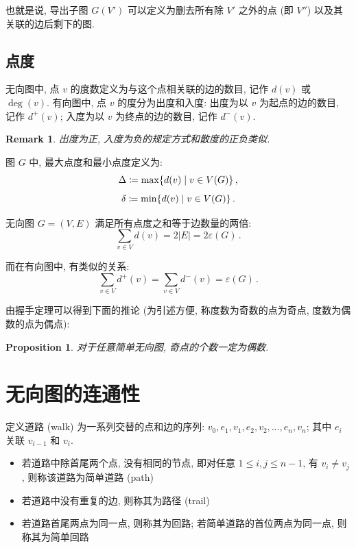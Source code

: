 \documentclass[UTF8]{ctexart}
\theoremstyle{mystyle}
\newtheorem{proposition}{Proposition}[section]
\theoremstyle{myremark}
\newtheorem*{remark}{Remark}
\theoremstyle{plain}
\DeclarePairedDelimiter\set{\{}{\}}
\begin{document}
也就是说, 导出子图 $ G(V') $ 可以定义为删去所有除 $ V' $ 之外的点 (即 $ V'' $) 以及其关联的边后剩下的图.

\subsection{点度}
\begin{definition}[\text{度}]
    无向图中, 点 $ v $ 的度数定义为与这个点相关联的边的数目, 记作 $ d(v) $ 或 $ \deg(v) $. 有向图中, 点 $ v $ 的度分为出度和入度: 出度为以 $ v $ 为起点的边的数目, 记作 $ d^+(v) $; 入度为以 $ v $ 为终点的边的数目, 记作 $ d^-(v) $.
\end{definition}

\begin{remark}
    出度为正, 入度为负的规定方式和散度的正负类似.
\end{remark}

图 $ G $ 中, 最大点度和最小点度定义为:
\[ \Delta \coloneqq \max \set{d(v) \mid v \in V(G)} \,,\]
\[ \delta \coloneqq \min \set{d(v) \mid v \in V(G)} \,.\]

\begin{theorem}
    无向图 $ G = (V, E) $ 满足所有点度之和等于边数量的两倍:
    \[ \sum_{v \in V} d (v) = 2 |E| = 2 \varepsilon(G) \,.\]

    而在有向图中, 有类似的关系:
    \[ \sum_{v \in V} d^+(v) = \sum_{v \in V} d^-(v) =  \varepsilon(G) \,.\]
\end{theorem}

由握手定理可以得到下面的推论 (为引述方便, 称度数为奇数的点为奇点, 度数为偶数的点为偶点):
\begin{proposition}
    对于任意简单无向图, 奇点的个数一定为偶数.
\end{proposition}



\section{无向图的连通性}
\begin{definition}
    定义道路 (walk) 为一系列交替的点和边的序列: $ v_0, e_1, v_1, e_2, v_2, \dots, e_n, v_n $; 其中 $ e_i $ 关联 $ v_{i - 1} $ 和 $ v_i $. 
    \begin{itemize}
        \item 若道路中除首尾两个点, 没有相同的节点, 即对任意 $ 1 \leqslant i, j \leqslant n - 1 $, 有 $ v_i \neq v_j $, 则称该道路为简单道路 (path)
        \item 若道路中没有重复的边, 则称其为路径 (trail)
        \item 若道路首尾两点为同一点, 则称其为回路; 若简单道路的首位两点为同一点, 则称其为简单回路
    \end{itemize}
\end{definition}
\end{document}

